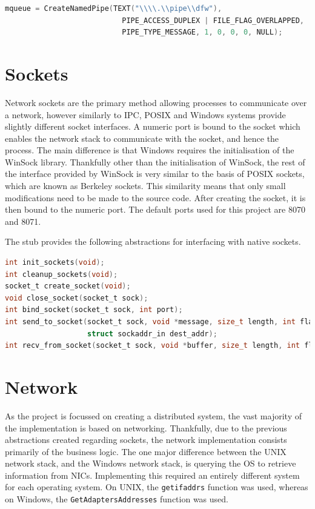 \documentclass[a4paper, 11pt]{report}
\begin{document}
\begin{lstlisting}[language=c,style=c,caption=Creating the message queue on Windows]
mqueue = CreateNamedPipe(TEXT("\\\\.\\pipe\\dfw"),
                           PIPE_ACCESS_DUPLEX | FILE_FLAG_OVERLAPPED,
                           PIPE_TYPE_MESSAGE, 1, 0, 0, 0, NULL);
\end{lstlisting}

\section{Sockets}
Network sockets are the primary method allowing processes to communicate over a network, however similarly to \acrshort{IPC}, \acrshort{POSIX} and Windows systems provide slightly different socket interfaces. A numeric port is bound to the socket which enables the network stack to communicate with the socket, and hence the process. The main difference is that Windows requires the initialisation of the WinSock\cite{winsock} library. Thankfully other than the initialisation of WinSock, the rest of the interface provided by WinSock is very similar to the basis of \acrshort{POSIX} sockets, which are known as Berkeley sockets. This similarity means that only small modifications need to be made to the source code. After creating the socket, it is then bound to the numeric port. The default ports used for this project are 8070 and 8071.

The \gls{stub} provides the following abstractions for interfacing with native sockets.
\begin{lstlisting}[language=c,style=c,caption=Socket API]
int init_sockets(void);
int cleanup_sockets(void);
socket_t create_socket(void);
void close_socket(socket_t sock);
int bind_socket(socket_t sock, int port);
int send_to_socket(socket_t sock, void *message, size_t length, int flags,
                   struct sockaddr_in dest_addr);
int recv_from_socket(socket_t sock, void *buffer, size_t length, int flags);
\end{lstlisting}

\section{Network}
As the project is focussed on creating a distributed system, the vast majority of the implementation is based on networking. Thankfully, due to the previous abstractions created regarding sockets, the network implementation consists primarily of the business logic. The one major difference between the UNIX network stack, and the Windows network stack, is querying the \acrshort{OS} to retrieve information from \acrshort{NIC}s. Implementing this required an entirely different system for each operating system. On UNIX, the \texttt{getifaddrs} function was used, whereas on Windows, the \texttt{GetAdaptersAddresses} function was used.
\end{document}

